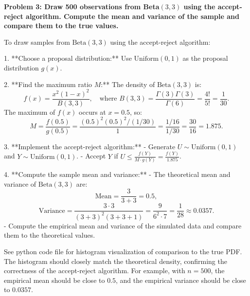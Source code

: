 \documentclass[12pt]{article}
\begin{document}
\begin{homeworkProblem}
\textbf{Problem 3: Draw 500 observations from Beta$(3,3)$ using the accept-reject algorithm. Compute the mean and variance of the sample and compare them to the true values.}

\begin{solution}
To draw samples from \( \text{Beta}(3,3) \) using the accept-reject algorithm:

1. **Choose a proposal distribution:**
   Use \( \text{Uniform}(0,1) \) as the proposal distribution \( g(x) \).

2. **Find the maximum ratio \( M \):**
   The density of \( \text{Beta}(3,3) \) is:
   \[
   f(x) = \frac{x^{2} (1-x)^{2}}{B(3,3)}, \quad \text{where } B(3,3) = \frac{\Gamma(3)\Gamma(3)}{\Gamma(6)} = \frac{4!}{5!} = \frac{1}{30}.
   \]
   The maximum of \( f(x) \) occurs at \( x = 0.5 \), so:
   \[
   M = \frac{f(0.5)}{g(0.5)} = \frac{(0.5)^2 (0.5)^2 / (1/30)}{1} = \frac{1/16}{1/30} = \frac{30}{16} = 1.875.
   \]

3. **Implement the accept-reject algorithm:**
   - Generate \( U \sim \text{Uniform}(0,1) \) and \( Y \sim \text{Uniform}(0,1) \).
   - Accept \( Y \) if \( U \leq \frac{f(Y)}{M \cdot g(Y)} = \frac{f(Y)}{1.875} \).

4. **Compute the sample mean and variance:**
   - The theoretical mean and variance of \( \text{Beta}(3,3) \) are:
     \[
     \text{Mean} = \frac{3}{3 + 3} = 0.5,
     \]
     \[
     \text{Variance} = \frac{3 \cdot 3}{(3 + 3)^2 (3 + 3 + 1)} = \frac{9}{6^2 \cdot 7} = \frac{1}{28} \approx 0.0357.
     \]
   - Compute the empirical mean and variance of the simulated data and compare them to the theoretical values.

   See python code file for histogram visualization of comparison to the true PDF. The histogram should closely match the theoretical density, confirming the correctness of the accept-reject algorithm. For example, with \( n = 500 \), the empirical mean should be close to \( 0.5 \), and the empirical variance should be close to \( 0.0357 \).
\end{solution}
\end{homeworkProblem}
\end{document}
